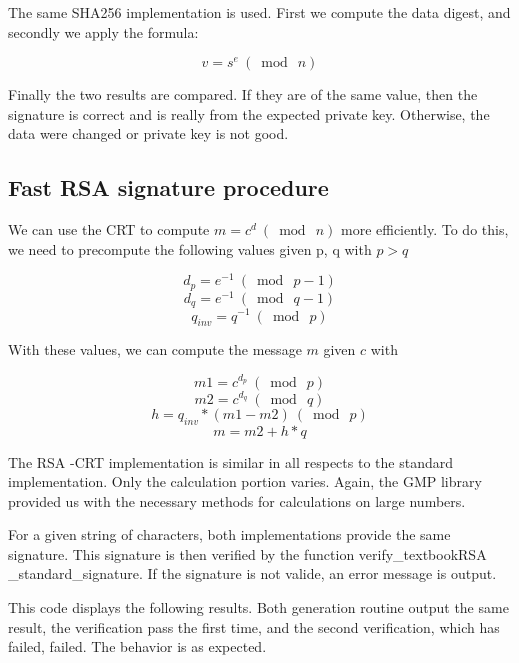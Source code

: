 \documentclass[a4paper]{report}
\begin{document}
The same SHA256 implementation is used. First we compute the data digest, and secondly we apply the formula:

\[
v = s^e  \ (\bmod{\ n} )
\]

Finally the two results are compared. If they are of the same value, then the signature is correct and is really from the expected private key. Otherwise, the data were changed or private key is not good.


\newpage
\subsection{Fast RSA signature procedure}
We can use the CRT to compute $m = c^d\ (\bmod{\ n})$ more efficiently. To do this, we need to precompute the following values given p, q with $p > q$

\[
d_p = e^{-1} \ (\bmod{\ p - 1} )
\]
\[
d_q = e^{-1} \ (\bmod{\ q - 1} )
\]
\[
q_{inv} = q^{-1} \ ( \bmod{\ p} )
\]

With these values, we can compute the message $m$ given $c$ with

\[
m1 = c^{d_p}\ (\bmod\ p)
\]
\[
m2 = c^{d_q}\ (\bmod\ q)
\]
\[
h = q_{inv} * (m1 - m2)\ (\bmod\ p)
\]
\[
m = m2 + h*q 
\]

The RSA -CRT implementation is similar in all respects to the standard implementation. Only the calculation portion varies. Again, the GMP library provided us with the necessary methods for calculations on large numbers.


For a given string of characters, both implementations provide the same signature. This signature is then verified by the function verify\_textbookRSA\\\_standard\_signature. If the signature is not valide, an error message is output.


This code displays the following results. Both generation routine output the same result, the verification pass the first time, and the second verification, which has failed, failed. The behavior is as expected.
\end{document}
